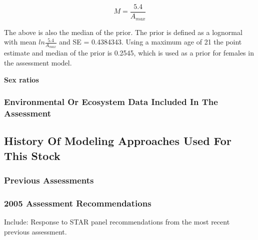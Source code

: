 \documentclass[12pt,]{article}
\begin{document}
\begin{equation}
M = \frac{5.4}{A_{max}}
\end{equation}

The above is also the median of the prior. The prior is defined as a
lognormal with mean \(ln\frac{5.4}{A_{max}}\) and SE = 0.4384343. Using
a maximum age of 21 the point estimate and median of the prior is
0.2545, which is used as a prior for females in the assessment model.

\vspace{.5cm}

\textbf{Sex ratios}

\subsubsection{Environmental Or Ecosystem Data Included In The
Assessment}\label{environmental-or-ecosystem-data-included-in-the-assessment}

\subsection{History Of Modeling Approaches Used For This
Stock}\label{history-of-modeling-approaches-used-for-this-stock}

\subsubsection{Previous Assessments}\label{previous-assessments}

\subsubsection{2005 Assessment
Recommendations}\label{assessment-recommendations}

Include: Response to STAR panel recommendations from the most recent
previous assessment.
\end{document}
